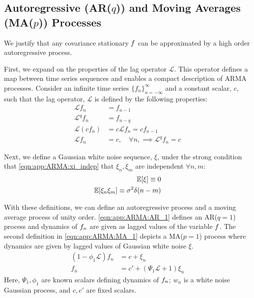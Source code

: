 \subsection{Autoregressive (AR($q$)) and Moving Averages (MA($p$)) Processes}
We justify that any covariance stationary $f$ can be approximated by a high order autoregressive process.  


First, we expand on the properties of the lag operator $\mathcal{L}$. This operator defines a map between time series sequences and enables a compact description of ARMA processes. Consider an infinite time series $\{ f_n \}_{n = -\infty}^{\infty}$ and a constant scalar, $c$, such that the lag operator, $\mathcal{L}$ is defined by the following properties:
\begin{align}
\mathcal{L} f_n & = f_{n-1} \\
\mathcal{L}^q f_n & = f_{n-q} \\
\mathcal{L}(cf_n) & = c\mathcal{L}f_n = cf_{n-1}  \\
\mathcal{L}f_n & = c, \quad \forall n, \implies \mathcal{L}^q f_n  = c
\end{align}

Next, we define a Gaussian white noise sequence, $\xi$, under the strong condition that \cref{eqn:app:ARMA:xi_indep} that $\xi_n, \xi_m$ are independent $\forall n, m $:
\begin{align}
\mathbb{E}[\xi] \equiv 0  \\
\mathbb{E}[\xi_n \xi_m] \equiv \sigma^2 \delta(n-m)\label{eqn:app:ARMA:xi_indep}   
\end{align}

With these definitions, we can define an autoregressive process and a moving average process of unity order.  \cref{eqn:app:ARMA:AR_1} defines an AR($q=1$) process and dynamics of $f_n$ are given as lagged values of the variable $f$. The second definition in \cref{eqn:app:ARMA:MA_1} depicts a MA($p = 1$) process where dynamics are given by lagged values of Gaussian white noise $\xi$. 
\begin{align}
(1 - \phi_1 \mathcal{L}) f_n  & = c + \xi_n  \label{eqn:app:ARMA:AR_1} \\
f_n & = c' + (\Psi_1 \mathcal{L} + 1)\xi_n  \label{eqn:app:ARMA:MA_1} 
\end{align}
Here, $\Psi_1, \phi_1$ are known scalars defining dynamics of $f_n$; $w_n$ is a white noise Gaussian process, and $c, c'$ are fixed scalars. 


